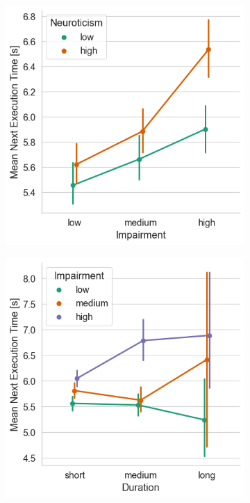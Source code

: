 \begin{figure}
    \centering
    \begin{subfigure}[t]{.28\textwidth}
        \centering
        \includegraphics[width=\textwidth]{./model_data/imp_neur_vs_exectime.png}
        \caption{}\label{fig:timing:impneurvsetime}
    \end{subfigure}%
    \hspace{.05\textwidth}%
    \begin{subfigure}[t]{.28\textwidth}
        \centering
        \includegraphics[width=\textwidth]{./model_data/duration_vs_exectime.png}

\end{subfigure}
\end{figure}
